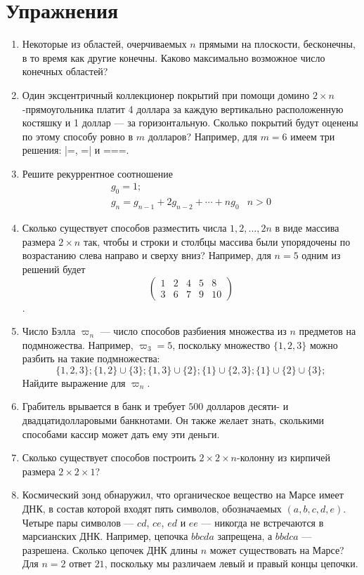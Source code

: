 \documentclass[14pt]{book}
\begin{document}
\chapter{Упражнения}
\begin{enumerate}
\item Некоторые из областей, очерчиваемых $n$ прямыми на плоскости, бесконечны,
в то время как другие конечны. Каково максимально возможное число конечных областей?

\item Один эксцентричный коллекционер покрытий при помощи домино $2 \times n$-прямоугольника
платит 4 доллара за каждую вертикально расположенную костяшку и 1 доллар --- за горизонтальную.
Сколько покрытий будут оценены по этому способу ровно в $m$ долларов? Например, для $m=6$ имеем
три решения: |=, =| и ===.

\item Решите рекуррентное соотношение
$$
\begin{array}{ll}
g_0 = 1; \\
g_n = g_{n-1} + 2g_{n-2} + \cdots + ng_0 & n>0
\end{array}
$$

\item Сколько существует способов разместить числа ${1, 2, \ldots , 2n}$ 
в виде массива размера $2 \times n$ так, чтобы и строки и столбцы массива
были упорядочены по возрастанию слева направо и сверху вниз?
Например, для $n=5$ одним из решений будет 
$$\begin{pmatrix}
1 & 2 & 4 & 5 & 8 \\
3 & 6 & 7 & 9 & 10 
\end{pmatrix}$$.

\item Число Бэлла $\varpi_n$ --- число способов разбиения множества из $n$ предметов на подмножества.
      Например, $\varpi_3=5$, поскольку множество $\{1,2,3\}$ можно разбить на такие подмножества:
      $$\{1,2,3\}; \{1,2\}\cup\{3\}; \{1,3\}\cup\{2\}; \{1\}\cup\{2,3\}; \{1\}\cup\{2\}\cup\{3\}; $$
      Найдите выражение для $\varpi_n$.

\item Грабитель врывается в банк и требует $500$ долларов десяти- и двадцатидолларовыми банкнотами.
      Он также желает знать, сколькими способами кассир может дать ему эти деньги.

\item Сколько существует способов построить $2 \times 2 \times n$-колонну из кирпичей
      размера $2 \times 2 \times 1$?
      
\item Космический зонд обнаружил, что органическое вещество на Марсе имеет ДНК, в состав
      которой входят пять символов, обозначаемых $(a, b, c, d, e)$. Четыре пары символов
      --- $cd$, $ce$, $ed$ и $ee$ --- никогда не встречаются в марсианских ДНК.
      Например, цепочка $bbcda$ запрещена, а $bbdca$ --- разрешена.
      Сколько цепочек ДНК длины $n$ может существовать на Марсе?
      Для $n=2$ ответ $21$, поскольку мы различаем левый и правый концы цепочки.

\end{enumerate}
\end{document}
